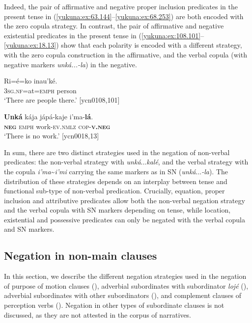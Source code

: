 \documentclass[output=paper,colorlinks,citecolor=brown]{langscibook}
\begin{document}
Indeed, the pair of affirmative and negative proper inclusion predicates in the present tense in (\ref{yukuna:ex:63.144}--\ref{yukuna:ex:68.253}) are both encoded with the zero copula strategy. In contrast, the pair of affirmative and negative existential predicates in the present tense in (\ref{yukuna:ex:108.101}--\ref{yukuna:ex:18.13}) show that each polarity is encoded with a different strategy, with the zero copula construction in the affirmative, and the verbal copula (with negative markers \textit{unká...-la}) in the negative. 

\ea\label{yukuna:ex:108.101}
\gll Ri=é=ko inau'ké.\\
\textsc{3sg.nf}=at=\textsc{emph} person \\
\glt ‘There are people there.’ [ycn0108,101]
\z

\ea\label{yukuna:ex:18.13}
\gll \textbf{Unká} kája jápá-kaje i'ma-\textbf{lá}.\\
\textbf{\textsc{neg}} \textsc{emph} work-\textsc{ev.nmlz} \textsc{cop}-\textbf{\textsc{v.neg}}\\
\glt ‘There is no work.’ [ycn0018,13]
\z

In sum, there are two distinct strategies used in the negation of non-verbal predicates: the non-verbal strategy with \textit{unká}{...}\textit{kalé}, and the verbal strategy with the copula \textit{i'ma}{\textasciitilde}\textit{i'mi} carrying the same markers as in SN (\textit{unká}{...}\textit{-la}). The distribution of these strategies depends on an interplay between tense and functional sub-type of non-verbal predication. Crucially, equation, proper inclusion and attributive predicates allow both the non-verbal negation strategy and the verbal copula with SN markers depending on tense, while location, existential and possessive predicates can only be negated with the verbal copula and SN markers.

\subsection{Negation in non-main clauses}\label{yukuna:negsub}
In this section, we describe the different negation strategies used in the negation of purpose of motion clauses (), adverbial subordinates with subordinator \textit{lojé} (), adverbial subordinates with other subordinators (), and complement clauses of perception verbs (). Negation in other types of subordinate clauses is not discussed, as they are not attested in the corpus of narratives. 
\end{document}
